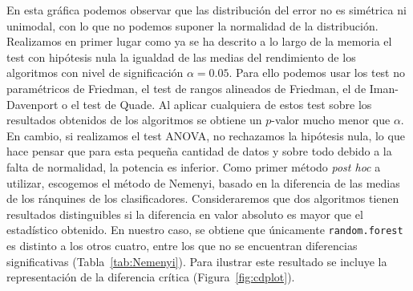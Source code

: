 	En esta gráfica podemos observar que las distribución del
error no es simétrica ni unimodal, con lo que no podemos
suponer la normalidad de la distribución. Realizamos en 
primer lugar como ya se ha descrito a lo largo de la memoria
el test con hipótesis nula la igualdad de las medias del
rendimiento de los algoritmos con nivel de significación
$\alpha = 0.05$. Para ello podemos usar
los test no paramétricos de Friedman, el test de
rangos alineados de Friedman, el de Iman-Davenport o el
test de Quade. Al aplicar cualquiera de estos test sobre
los resultados obtenidos de los algoritmos se obtiene
un $p$-valor mucho menor que $\alpha$. En cambio, 
si realizamos el test ANOVA, no rechazamos la hipótesis
nula, lo que hace pensar que para esta pequeña cantidad de
datos y sobre todo debido a la falta de normalidad, la
potencia es inferior. Como primer método \textit{post hoc}
a utilizar, escogemos el método de Nemenyi, basado en la
diferencia de las medias de los ránquines de los 
clasificadores. Consideraremos que dos algoritmos tienen
resultados distinguibles si la diferencia en valor absoluto
es mayor que el estadístico obtenido. En nuestro caso, 
se obtiene que únicamente \texttt{random.forest} es distinto
a los otros cuatro, entre los que no se encuentran 
diferencias significativas (Tabla~\ref{tab:Nemenyi}). Para ilustrar este resultado
se incluye la representación de la diferencia crítica (Figura~\ref{fig:cdplot}).

\begin{table}[]
\centering
\caption{Test de Nemenyi}
\label{tab:Nemenyi}
\end{table}

